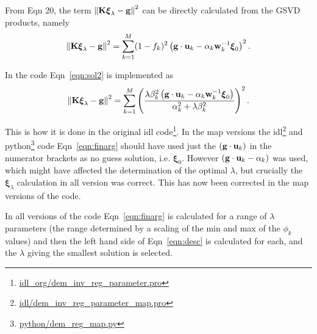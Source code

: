 \documentclass[12pt,a4paper]{article}
\begin{document}
From \citet{1992InvPr...8..849H} Eqn 20, the term $\left\|\bf{K\boldsymbol{\xi}_\lambda-g}\right\|^2$ can be directly calculated from the GSVD products, namely
\begin{equation}\label{eqn:sol2}
\left\|\bf{K\boldsymbol{\xi}_\lambda-g}\right\|^2=\sum_{k=1}^ M (1-f_k)^2\left(
{\bf g}\cdot {\bf u}_k - \alpha_k{\bf w}_k^{-1}\boldsymbol{\xi}_0
\right)^2.
\end{equation}

In the code Eqn~\ref{eqn:sol2} is implemented as
\begin{equation}\label{eqn:finarg}
    \left\|\bf{K\boldsymbol{\xi}_\lambda-g}\right\|^2=\sum_{k=1}^ M \left(\frac{\lambda\beta_k^2\left({\bf g}\cdot {\bf u}_k-\alpha_k{\bf w}_k^{-1}\boldsymbol{\xi}_0\right)}{\alpha_k^2 + \lambda\beta_k^2}\right)^2.
\end{equation}

This is how it is done in the original idl code\footnote{\href{https://github.com/ianan/demreg/blob/master/idl_org/dem_inv_reg_parameter.pro}{idl\_org/dem\_inv\_reg\_parameter.pro}}. In the map versions the idl\footnote{\href{https://github.com/ianan/demreg/blob/master/idl/dem_inv_reg_parameter_map.pro}{idl/dem\_inv\_reg\_parameter\_map.pro}} and python\footnote{\href{https://github.com/ianan/demreg/blob/master/python/dem_reg_map.py}{python/dem\_reg\_map.py}} code Eqn~\ref{eqn:finarg} should have used just the $\left({\bf g}\cdot {\bf u}_k\right)$ in the numerator brackets as no guess solution, i.e. $\boldsymbol{\xi}_0$. However $\left({\bf g}\cdot {\bf u}_k-\alpha_k\right)$ was used, which might have affected the determination of the optimal $\lambda$, but crucially the $\boldsymbol{\xi}_\lambda$ calculation in all version was correct. This has now been corrected in the map versions of the code.

In all versions of the code Eqn~\ref{eqn:finarg} is calculated for a range of $\lambda$ parameters (the range determined by a scaling of the min and max of the $\phi_k$ values) and then the left hand side of Eqn~\ref{eqn:desc} is calculated for each, and the $\lambda$ giving the smallest solution is selected.
\end{document}
